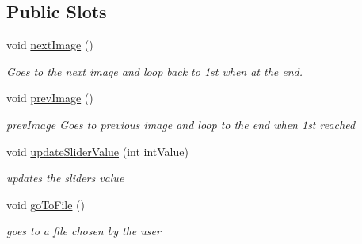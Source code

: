 \subsection*{Public Slots}
\begin{DoxyCompactItemize}
\item 
void \hyperlink{class_image_displayer_a9a57980fbe20b55a59f3c189275c3f47}{next\+Image} ()\hypertarget{class_image_displayer_a9a57980fbe20b55a59f3c189275c3f47}{}\label{class_image_displayer_a9a57980fbe20b55a59f3c189275c3f47}

\begin{DoxyCompactList}\small\item\em Goes to the next image and loop back to 1st when at the end. \end{DoxyCompactList}\item 
void \hyperlink{class_image_displayer_a32b7d20ab0b8959fd08580a2855ff74f}{prev\+Image} ()\hypertarget{class_image_displayer_a32b7d20ab0b8959fd08580a2855ff74f}{}\label{class_image_displayer_a32b7d20ab0b8959fd08580a2855ff74f}

\begin{DoxyCompactList}\small\item\em prev\+Image Goes to previous image and loop to the end when 1st reached \end{DoxyCompactList}\item 
void \hyperlink{class_image_displayer_a34877e02ed6399153428be9ba4c9474a}{update\+Slider\+Value} (int int\+Value)
\begin{DoxyCompactList}\small\item\em updates the slider\textquotesingle{}s value \end{DoxyCompactList}\item 
void \hyperlink{class_image_displayer_acb3df03f56e022a8814484923594a916}{go\+To\+File} ()\hypertarget{class_image_displayer_acb3df03f56e022a8814484923594a916}{}\label{class_image_displayer_acb3df03f56e022a8814484923594a916}

\begin{DoxyCompactList}\small\item\em goes to a file chosen by the user \end{DoxyCompactList}\end{DoxyCompactItemize}
